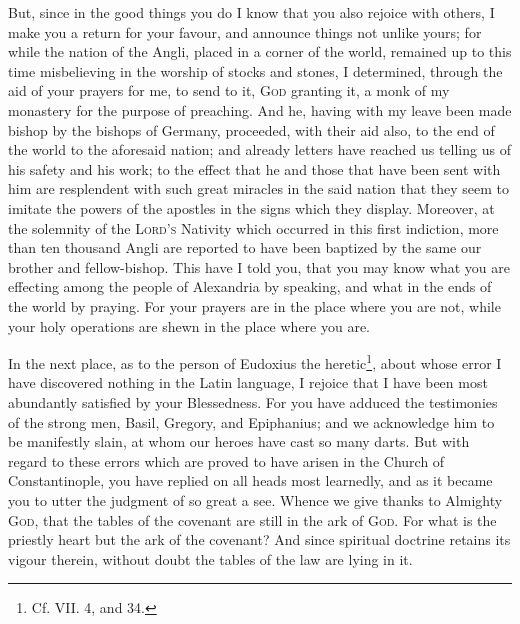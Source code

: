 But, since in the good things you do I know that you also rejoice with others, I make you a return for your favour, and announce things not unlike yours; for while the nation of the Angli, placed in a corner of the world, remained up to this time misbelieving in the worship of stocks and stones, I determined, through the aid of your prayers for me, to send to it, \textsc{God} granting it, a monk of my monastery for the purpose of preaching. And he, having with my leave been made bishop by the bishops of Germany, proceeded, with their aid also, to the end of the world to the aforesaid nation; and already letters have reached us telling us of his safety and his work; to the effect that he and those that have been sent with him are resplendent with such great miracles in the said nation that they seem to imitate the powers of the apostles in the signs which they display. Moreover, at the solemnity of the \textsc{Lord’s} Nativity which occurred in this first indiction, more than ten thousand Angli are reported to have been baptized by the same our brother and fellow-bishop. This have I told you, that you may know what you are effecting among the people of Alexandria by speaking, and what in the ends of the world by praying. For your prayers are in the place where you are not, while your holy operations are shewn in the place where you are.

In the next place, as to the person of Eudoxius the heretic\footnote{Cf. VII. 4, and 34.}, about whose error I have discovered nothing in the Latin language, I rejoice that I have been most abundantly satisfied by your Blessedness. For you have adduced the testimonies of the strong men, Basil, Gregory, and Epiphanius; and we acknowledge him to be manifestly slain, at whom our heroes have cast so many darts. But with regard to these errors which are proved to have arisen in the Church of Constantinople, you have replied on all heads most learnedly, and as it became you to utter the judgment of so great a see. Whence we give thanks to Almighty \textsc{God}, that the tables of the covenant are still in the ark of \textsc{God}. For what is the priestly heart but the ark of the covenant? And since spiritual doctrine retains its vigour therein, without doubt the tables of the law are lying in it.

